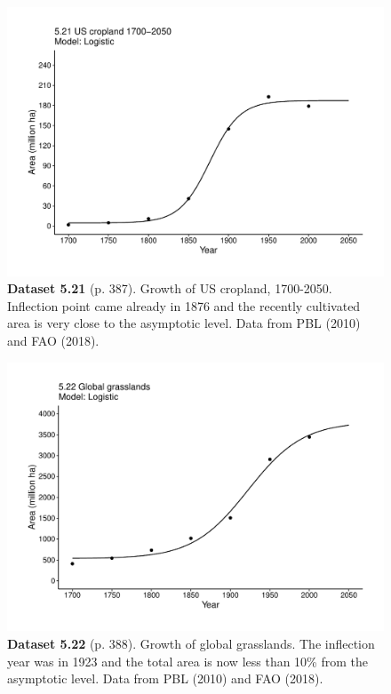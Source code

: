 \documentclass[aps,rmp,preprint,superscriptaddress,10pt,onecolumn]{article}
\begin{document}
\clearpage
\begin{figure}[h]
\includegraphics[width=\textwidth]{output/figs-ggplot/5.21.pdf}
\caption*{\textbf{Dataset 5.21} (p. 387). Growth of US cropland, 1700-2050. Inflection point came already in 1876 and the recently cultivated area is very close to the asymptotic level. Data from PBL (2010) and FAO (2018).}
\end{figure}
	
\clearpage
\begin{figure}[h]
\includegraphics[width=\textwidth]{output/figs-ggplot/5.22.pdf}
\caption*{\textbf{Dataset 5.22} (p. 388). Growth of global grasslands. The inflection year was in 1923 and the total area is now less than 10\% from the asymptotic level. Data from PBL (2010) and FAO (2018).}
\end{figure}
	
\end{document}
